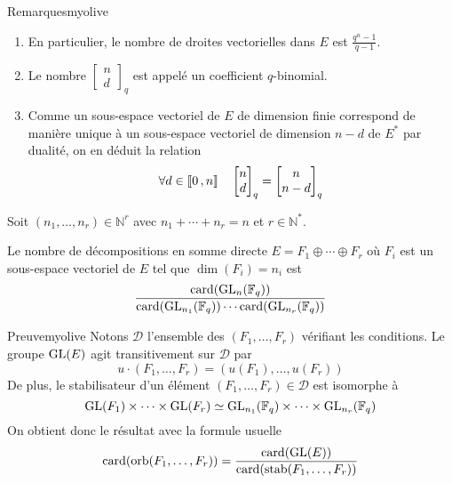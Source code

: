     \begin{omed}{Remarques}{myolive}
        \begin{enumerate}[label=\textcolor{myolive}{(\arabic*)}]
            \item En particulier, le nombre de droites vectorielles dans $E$ est $\frac{q^n - 1}{q - 1}$.
            \item Le nombre $\begin{bmatrix}
                n \\
                d
            \end{bmatrix}_q$ est appelé un coefficient $q$-binomial.
            \item Comme un sous-espace vectoriel de $E$ de dimension finie correspond de manière unique à un sous-espace vectoriel de dimension $n - d$ de $E^*$ par dualité, on en déduit la relation 
            \[ \forall d \in \left\llbracket 0 \, , n \right\rrbracket \quad \begin{bmatrix}
                n \\
                d
            \end{bmatrix}_q = \begin{bmatrix}
                n \\
                n-d
            \end{bmatrix}_q\]
        \end{enumerate} 
    \end{omed}

    \begin{prop}{}{}
        Soit $(n_1,\ldots,n_r) \in \mathbb{N}^r$ avec $n_1 + \cdots + n_r = n$ et $r \in \mathbb{N}^*$. 

        Le nombre de décompositions en somme directe $E = F_1 \oplus \cdots \oplus F_r$ où $F_i$ est un sous-espace vectoriel de $E$ tel que $\dim(F_i) = n_i$ est 
        \[ \frac{\operatorname{card}(\operatorname{GL}_n(\mathbb{F}_q))}{\operatorname{card}(\operatorname{GL}_{n_1}(\mathbb{F}_q)) \cdots \operatorname{card}(\operatorname{GL}_{n_r}(\mathbb{F}_q))} \]
    \end{prop}

    \begin{demo}{Preuve}{myolive}
        Notons $\mathcal{D}$ l’ensemble des $(F_1,\ldots,F_r)$ vérifiant les conditions. Le groupe $\operatorname{GL}(E)$ agit transitivement sur $\mathcal{D}$ par 
        \[ u \cdotp (F_1,\ldots,F_r) = (u(F_1),\ldots,u(F_r)) \]   
        De plus, le stabilisateur d’un élément $(F_1,\ldots,F_r) \in \mathcal{D}$ est isomorphe à 
        \[ \operatorname{GL}(F_1) \times \cdots \times \operatorname{GL}(F_r) \simeq \operatorname{GL}_{n_1}(\mathbb{F}_q) \times \cdots \times \operatorname{GL}_{n_r}(\mathbb{F}_q) \]   
        On obtient donc le résultat avec la formule usuelle 
        \[ \operatorname{card}(\operatorname{orb}(F_1,\ldots,F_r)) = \frac{\operatorname{card}(\operatorname{GL}(E))}{\operatorname{card}(\operatorname{stab}(F_1,\ldots,F_r))} \]
    \end{demo}
